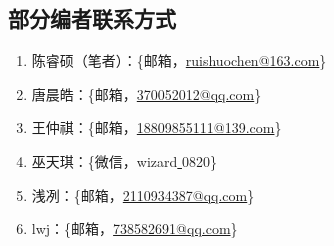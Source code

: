 \documentclass[a4paper,11pt,notitlepage]{article}
\begin{document}
\begin{appendices}
\section{部分编者联系方式}\label{部分编者联系方式}
\begin{adjustwidth}{2em}{0pt}
\begin{enumerate}
    \item 陈睿硕（笔者）：\{邮箱，\href{mailto:ruishuochen@163.com}{ruishuochen@163.com}\}
    \item 唐晨皓：\{邮箱，\href{mailto:370052012@qq.com}{370052012@qq.com}\}
    \item 王仲祺：\{邮箱，\href{mailto:18809855111@139.com}{18809855111@139.com}\}
    \item 巫天琪：\{微信，wizard\underline{ }0820\}
    \item 浅冽：\{邮箱，\href{mailto:2110934387@qq.com}{2110934387@qq.com}\}
    \item lwj：\{邮箱，\href{mailto:738582691@qq.com}{738582691@qq.com}\}
\end{enumerate}
\end{adjustwidth}
\end{appendices}
\end{document}
